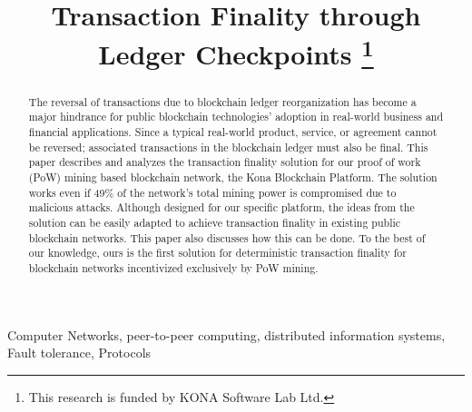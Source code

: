 \documentclass[conference]{IEEEtran}
\begin{document}
\title{Transaction Finality through Ledger Checkpoints 
	\thanks{This research is funded by KONA Software Lab Ltd.}
}

\author{
	\and		
	\and
}
\maketitle

\begin{abstract}
The reversal of transactions due to blockchain ledger reorganization has become a major hindrance for public blockchain technologies' adoption in real-world business and financial applications. Since a typical real-world product, service, or agreement cannot be reversed; associated transactions in the blockchain ledger must also be final. This paper describes and analyzes the transaction finality solution for our proof of work (PoW) mining based blockchain network, the Kona Blockchain Platform. The solution works even if 49\% of the network's total mining power is compromised due to malicious attacks. Although designed for our specific platform, the ideas from the solution can be easily adapted to achieve transaction finality in existing public blockchain networks. This paper also discusses how this can be done. To the best of our knowledge, ours is the first solution for deterministic transaction finality for blockchain networks incentivized exclusively by PoW mining.    
\end{abstract}

\begin{IEEEkeywords}
Computer Networks, peer-to-peer computing, distributed information systems, Fault tolerance, Protocols
\end{IEEEkeywords}
\end{document}
